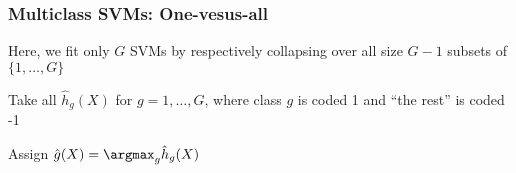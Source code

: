 \documentclass[12pt]{beamer}
\begin{document}
\begin{frame}
\frametitle{Multiclass SVMs: One-vesus-all}
Here, we fit only $G$ SVMs by respectively collapsing over all size $G-1$ subsets of $\{1,\ldots,G\}$

\vsp
Take all $\hat{h}_g(X)$ for $g=1,\ldots,G$, where class $g$ is coded 1 and ``the rest'' is coded -1

\vsp
Assign $\hat{g}(X) = \argmax_g \hat{h}_g(X)$
\vfill

\vvvsp
{}
\end{frame}
%
%
%
%
%
%
%
%
%
\end{document}
